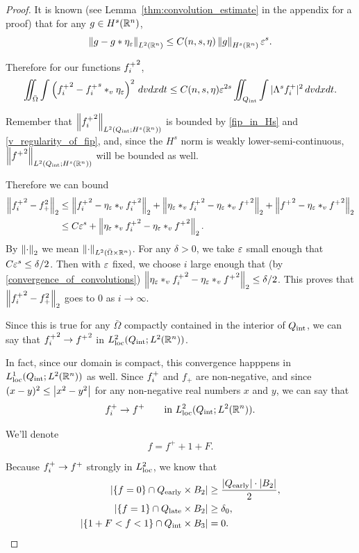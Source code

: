 \begin{proof}
It is known (see Lemma~\ref{thm:convolution_estimate} in the appendix for a proof) that for any $g \in H^s(\mathbb{R}^n)$, 
\[ \left\lVert g - g\ast \eta_\varepsilon\right\rVert_{L^2(\mathbb{R}^n)} \leq C(n,s,\eta) \left\lVert g\right\rVert_{H^s(\mathbb{R}^n)} \varepsilon^s. \]

Therefore for our functions ${f_i^+}^2$, 
\[ \iint_{\bar{\Omega}} \int \left( {f_i^+}^2 - {f_i^+}^s \ast_v \eta_\varepsilon \right)^2 \,dvdxdt \leq C(n,s,\eta) \varepsilon^{2s} \iint_{Q_\textrm{int}} \int |\Lambda^s {f_i^+}|^2 \,dvdxdt. \]

Remember that $\left\lVert{f_i^+}^2\right\rVert_{L^2({Q_\textrm{int}};H^s(\mathbb{R}^n))}$ is bounded by \eqref{fip_in_Hs} and \eqref{v_regularity_of_fip}, and, since the $H^s$ norm is weakly lower-semi-continuous, $\left\lVert{f^+}^2\right\rVert_{L^2({Q_\textrm{int}};H^s(\mathbb{R}^n))}$ will be bounded as well.  

Therefore we can bound
\begin{align*} 
\left\lVert{f_i^+}^2 - f_+^2\right\rVert_2 &\leq \left\lVert{f_i^+}^2 - \eta_\varepsilon \ast_v {f_i^+}^2\right\rVert_2 + \left\lVert\eta_\varepsilon \ast_v {f_i^+}^2 - \eta_\varepsilon \ast_v {f^+}^2\right\rVert_2 + \left\lVert{f^+}^2 - \eta_\varepsilon \ast_v {f^+}^2\right\rVert_2
\\ &\leq C \varepsilon^s + \left\lVert\eta_\varepsilon \ast_v {f_i^+}^2 - \eta_\varepsilon \ast_v {f^+}^2\right\rVert_2.
\end{align*}
By $\left\lVert\cdot\right\rVert_2$ we mean $\left\lVert\cdot\right\rVert_{L^2(\bar{\Omega}\times\mathbb{R}^n)}$.  For any $\delta > 0$, we take $\varepsilon$ small enough that $C \varepsilon^s \leq \delta/2$.  Then with $\varepsilon$ fixed, we choose $i$ large enough that (by \eqref{convergence_of_convolutions}) $\left\lVert\eta_\varepsilon \ast_v {f_i^+}^2 - \eta_\varepsilon \ast_v {f^+}^2\right\rVert_2 \leq \delta/2$.  This proves that $\left\lVert{f_i^+}^2 - f_+^2\right\rVert_2$ goes to 0 as $i \to \infty$.  

Since this is true for any $\bar{\Omega}$ compactly contained in the interior of ${Q_\textrm{int}}$, we can say that ${f_i^+}^2 \to {f^+}^2$ in $L^2_{\text{loc}}({Q_\textrm{int}};L^2(\mathbb{R}^n))$.  

In fact, since our domain is compact, this convergence happpens in $L^1_{\text{loc}}({Q_\textrm{int}};L^2(\mathbb{R}^n))$ as well.  Since ${f_i^+}$ and $f_+$ are non-negative, and since $(x-y)^2 \leq \left\lvert x^2 - y^2 \right\rvert$ for any non-negative real numbers $x$ and $y$, we can say that
\[ {f_i^+} \to {f^+} \qquad \textrm{in } L^2_{\text{loc}}({Q_\textrm{int}}; L^2(\mathbb{R}^n)). \]



We'll denote 
\[ f = f^+ + 1 + F. \]

Because ${f_i^+} \to f^+$ strongly in $L^2_{\text{loc}}$, we know that
\begin{equation}\label{mass_of_limit}
\begin{aligned}
|\{f = 0\} \cap {Q_\textrm{early}} \times B_2| &\geq \frac{|{Q_\textrm{early}}|\cdot|B_2|}{2}, \\
|\{f = 1 \} \cap {Q_\textrm{late}} \times B_2| &\geq \delta_0, \\
|\{1+F < f < 1 \} \cap {Q_\textrm{int}} \times B_3| &= 0. 
\end{aligned}
\end{equation}


\end{proof}
